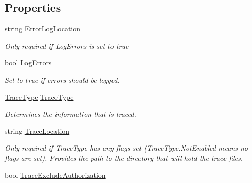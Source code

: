 \subsection*{Properties}
\begin{DoxyCompactItemize}
\item 
string \hyperlink{class_cloud_api_public_1_1_file_monitor_1_1_sync_settings_1_1_sync_settings_aaac8761efcaca44fc36cd1a9aeeed8dc}{Error\-Log\-Location}
\begin{DoxyCompactList}\small\item\em Only required if Log\-Errors is set to true \end{DoxyCompactList}\item 
bool \hyperlink{class_cloud_api_public_1_1_file_monitor_1_1_sync_settings_1_1_sync_settings_a8df145af03055d26636db13888d986af}{Log\-Errors}
\begin{DoxyCompactList}\small\item\em Set to true if errors should be logged. \end{DoxyCompactList}\item 
\hyperlink{namespace_cloud_api_public_1_1_static_a7e5ae8f2a85f427de3d6c8a5afcbb029}{Trace\-Type} \hyperlink{class_cloud_api_public_1_1_file_monitor_1_1_sync_settings_1_1_sync_settings_a3b4583948c5e9125a4b273eae17a7f71}{Trace\-Type}
\begin{DoxyCompactList}\small\item\em Determines the information that is traced. \end{DoxyCompactList}\item 
string \hyperlink{class_cloud_api_public_1_1_file_monitor_1_1_sync_settings_1_1_sync_settings_a75ff644a102cf658db1bf573953025fc}{Trace\-Location}
\begin{DoxyCompactList}\small\item\em Only required if Trace\-Type has any flags set (Trace\-Type.\-Not\-Enabled means no flags are set). Provides the path to the directory that will hold the trace files. \end{DoxyCompactList}\item 
bool \hyperlink{class_cloud_api_public_1_1_file_monitor_1_1_sync_settings_1_1_sync_settings_a994b4f12563c8a2da8457532f5d7e436}{Trace\-Exclude\-Authorization}

\end{DoxyCompactItemize}
